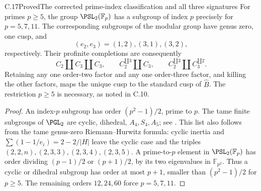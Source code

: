 \begin{statement}{C.17}{Proved}{The corrected prime-index classification and all three signatures}
For primes $p\geq5$, the group $\PSL_2(\mathbb F_p)$ has a
subgroup of index $p$ precisely for $p=5,7,11$. The corresponding
subgroups of the modular group have genus zero, one cusp, and
\[
 (e_2,e_3)=(1,2),(3,1),(3,2),
\]
respectively. Their profinite completions are consequently
\[
 C_2\amalg C_3\amalg C_3,\qquad
 C_2^{\amalg3}\amalg C_3,\qquad
 C_2^{\amalg3}\amalg C_3^{\amalg2}.
\]
Retaining any one order-two factor and any one order-three
factor, and killing the other factors, maps the unique cusp
to the standard cusp of $\widehat B$.
The restriction $p\geq5$ is necessary, as noted in C.10.
\end{statement}
\begin{proof}
An index-$p$ subgroup has order $(p^2-1)/2$, prime to $p$.
The tame finite subgroups of $\PGL_2$ are cyclic, dihedral,
$A_4,S_4,A_5$; see \cite[Introduction and Proposition 1.1]{PBC_Beauville2010}.
This list also follows from the tame genus-zero
Riemann--Hurwitz formula: cyclic inertia and
$\sum(1-1/e_i)=2-2/|H|$ leave the cyclic case and the
triples $(2,2,n),(2,3,3),(2,3,4),(2,3,5)$.
A prime-to-$p$ element in $\PSL_2(\mathbb F_p)$ has order
dividing $(p-1)/2$ or $(p+1)/2$, by its two eigenvalues in
$\mathbb F_{p^2}$. Thus a cyclic or dihedral subgroup has
order at most $p+1$, smaller than $(p^2-1)/2$ for $p\geq5$.
The remaining orders $12,24,60$ force $p=5,7,11$.


\end{proof}
